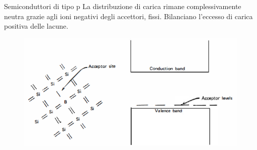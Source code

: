 \documentclass{beamer}
\begin{document}

\begin{frame}{Semiconduttori di tipo p}
 La distribuzione di carica rimane complessivamente neutra grazie agli ioni negativi degli accettori, fissi. Bilanciano l'eccesso di carica positiva delle lacune.
          \begin{figure}
\includegraphics[width=\textwidth]{images/drogaggio_p.PNG}
\end{figure}  
\end{frame}
\end{document}
